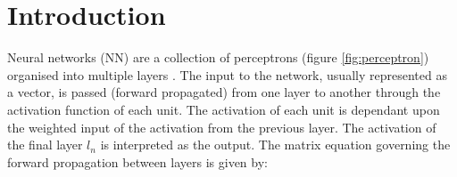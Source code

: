 \documentclass[journal]{IEEEtran}
\begin{document}




\maketitle









%
\IEEEpeerreviewmaketitle



\section{Introduction}

\noindent 
Neural networks (NN) are a collection of perceptrons (figure \ref{fig:perceptron}) organised into multiple layers \cite{murphy2012machine}. The input to the network, usually represented as a vector, is passed (forward propagated) from one layer to another through the activation function of each unit. The activation of each unit is dependant upon the weighted input of the activation from the previous layer. The activation of the final layer $l_n$ is interpreted as the output. The matrix equation governing the forward propagation between layers is given by:
\end{document}
